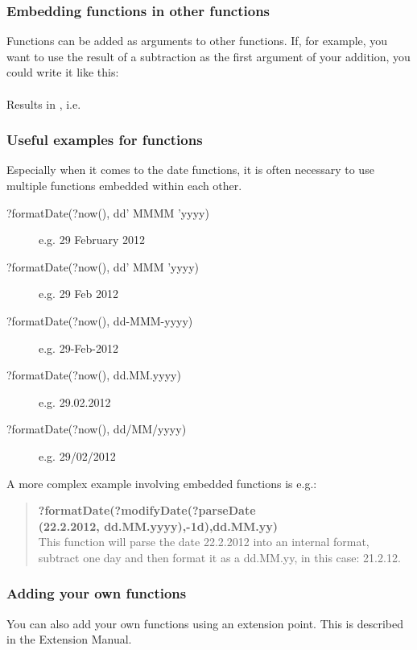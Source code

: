 \subsubsection{Embedding functions in other functions}
Functions can be added as arguments to other functions. If, for example, you want to use the result of a subtraction as the first argument of your addition, you could write it like this:\\
\\
Results in , i.e. \\

\subsubsection{Useful examples for functions}
Especially when it comes to the date functions, it is often necessary to use multiple functions embedded within each other. 
\begin{description}
\item [?formatDate(?now(), dd' MMMM 'yyyy)]{e.g. 29 February 2012}
\item [?formatDate(?now(), dd' MMM 'yyyy)]{e.g. 29 Feb 2012}
\item [?formatDate(?now(), dd-MMM-yyyy)]{e.g. 29-Feb-2012}
\item [?formatDate(?now(), dd.MM.yyyy)]{e.g. 29.02.2012}
\item [?formatDate(?now(), dd/MM/yyyy)]{e.g. 29/02/2012}
\end{description}
A more complex example involving embedded functions is e.g.:

\begin{quote}
\textbf{?formatDate(?modifyDate(?parseDate\\(22.2.2012, dd.MM.yyyy),-1d),dd.MM.yy)}\\
This function will parse the date 22.2.2012 into an internal format, subtract one day and then format it as a dd.MM.yy, in this case: 21.2.12.
\end{quote}



\subsubsection{Adding your own functions}
You can also add your own functions using an extension point. This is described in the Extension Manual. 



